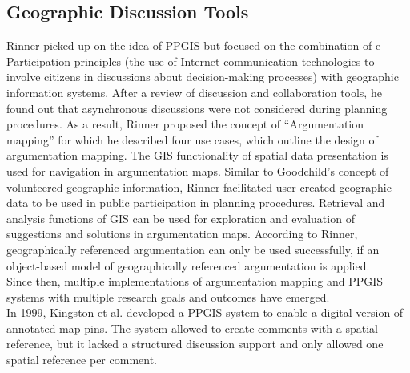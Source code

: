 \subsection{Geographic Discussion Tools}
\label{zweivier}
Rinner \cite{Rinner_ArgumentationMaps} picked up on the idea of PPGIS but focused on the combination of e-Participation principles (the use of Internet communication technologies to involve citizens in discussions about decision-making processes) with geographic information systems. After a review of discussion and collaboration tools, he found out that asynchronous discussions were not considered during planning procedures. As a result, Rinner proposed the concept of ``Argumentation mapping'' for which he described four use cases, which outline the design of argumentation mapping. The GIS functionality of spatial data presentation is used for navigation in argumentation maps. Similar to Goodchild's \cite{goodchild2007citizens} concept of volunteered geographic information, Rinner facilitated user created geographic data to be used in public participation in planning procedures. Retrieval and analysis functions of GIS can be used for exploration and evaluation of suggestions and solutions in argumentation maps. According to Rinner, geographically referenced argumentation can only be used successfully, if an object-based model of geographically referenced argumentation is applied.\\
Since then, multiple implementations of argumentation mapping and PPGIS systems with multiple research goals and outcomes have emerged.\\
In 1999, Kingston et al. \cite{kingston1999gis} developed a PPGIS system to enable a digital version of annotated map pins. The system allowed to create comments with a spatial reference, but it lacked a structured discussion support and only allowed one spatial reference per comment.\\
